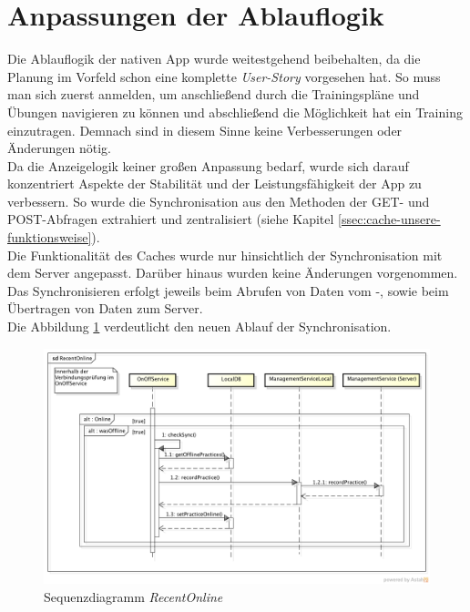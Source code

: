 \section{Anpassungen der Ablauflogik}
\label{sec:anpassungen-ablauflogik}
Die Ablauflogik der nativen App wurde weitestgehend beibehalten, da die Planung im Vorfeld schon eine komplette \textit{User-Story} vorgesehen hat. So muss man sich zuerst anmelden, um anschließend durch die Trainingspläne und Übungen navigieren zu können und abschließend die Möglichkeit hat ein Training einzutragen. Demnach sind in diesem Sinne keine Verbesserungen oder Änderungen nötig.\\
Da die Anzeigelogik keiner großen Anpassung bedarf, wurde sich darauf konzentriert Aspekte der Stabilität und der Leistungsfähigkeit der App zu verbessern. So wurde die Synchronisation aus den Methoden der GET- und POST-Abfragen extrahiert und zentralisiert (siehe Kapitel \ref{ssec:cache-unsere-funktionsweise}).\\
Die Funktionalität des Caches wurde nur hinsichtlich der Synchronisation mit dem Server angepasst. Darüber hinaus wurden keine Änderungen vorgenommen. Das Synchronisieren erfolgt jeweils beim Abrufen von Daten vom -, sowie beim Übertragen von Daten zum Server.\\
Die Abbildung \ref{pic:nat-RecentOnline} verdeutlicht den neuen Ablauf der Synchronisation. \\
\begin{figure}[!h]
\centering
\includegraphics[width=\linewidth]{content/images/fITNat-RecentOnline}
\caption{Sequenzdiagramm \textit{RecentOnline}}
\label{pic:nat-RecentOnline}
\end{figure}

